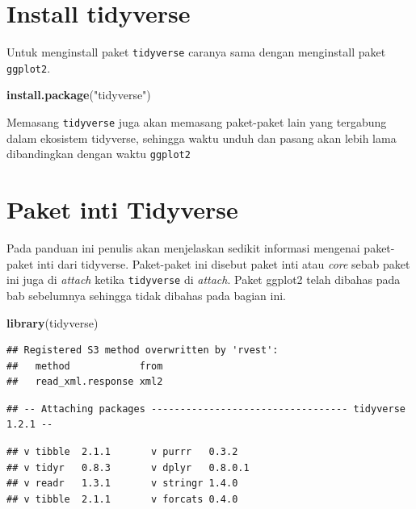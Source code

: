 \documentclass[]{book}
\newenvironment{Shaded}{\begin{snugshade}}{\end{snugshade}}
\newcommand{\KeywordTok}[1]{\textcolor[rgb]{0.13,0.29,0.53}{\textbf{#1}}}
\newcommand{\StringTok}[1]{\textcolor[rgb]{0.31,0.60,0.02}{#1}}
\newcommand{\NormalTok}[1]{#1}
\begin{document}
\section{Install tidyverse}\label{install-tidyverse}

Untuk menginstall paket \texttt{tidyverse} caranya sama dengan
menginstall paket \texttt{ggplot2}.

\begin{Shaded}
\begin{Highlighting}[]
\KeywordTok{install.package}\NormalTok{(}\StringTok{"tidyverse"}\NormalTok{)}
\end{Highlighting}
\end{Shaded}

Memasang \texttt{tidyverse} juga akan memasang paket-paket lain yang
tergabung dalam ekosistem tidyverse, sehingga waktu unduh dan pasang
akan lebih lama dibandingkan dengan waktu \texttt{ggplot2}

\section{Paket inti Tidyverse}\label{paket-inti-tidyverse}

Pada panduan ini penulis akan menjelaskan sedikit informasi mengenai
paket-paket inti dari tidyverse. Paket-paket ini disebut paket inti atau
\emph{core} sebab paket ini juga di \emph{attach} ketika
\texttt{tidyverse} di \emph{attach}. Paket ggplot2 telah dibahas pada
bab sebelumnya sehingga tidak dibahas pada bagian ini.

\begin{Shaded}
\begin{Highlighting}[]
\KeywordTok{library}\NormalTok{(tidyverse)}
\end{Highlighting}
\end{Shaded}

\begin{verbatim}
## Registered S3 method overwritten by 'rvest':
##   method            from
##   read_xml.response xml2
\end{verbatim}

\begin{verbatim}
## -- Attaching packages ---------------------------------- tidyverse 1.2.1 --
\end{verbatim}

\begin{verbatim}
## v tibble  2.1.1       v purrr   0.3.2  
## v tidyr   0.8.3       v dplyr   0.8.0.1
## v readr   1.3.1       v stringr 1.4.0  
## v tibble  2.1.1       v forcats 0.4.0
\end{verbatim}
\end{document}
